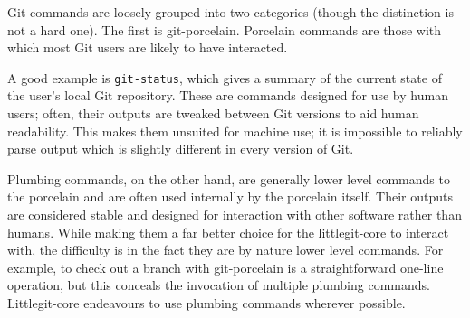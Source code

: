 Git commands are loosely grouped into two categories (though the distinction is not a hard one). The first is git-porcelain. Porcelain commands are those with which most Git users are likely to have interacted.

A good example is \texttt{git-status}, which gives a summary of the current state of the user's local Git repository. These are commands designed for use by human users; often, their outputs are tweaked between Git versions to aid human readability. This makes them unsuited for machine use; it is impossible to reliably parse output which is slightly different in every version of Git.

Plumbing commands, on the other hand, are generally lower level commands to the porcelain and are often used internally by the porcelain itself. Their outputs are considered stable and designed for interaction with other software rather than humans. While making them a far better choice for the littlegit-core to interact with, the difficulty is in the fact they are by nature lower level commands. For example, to check out a branch with git-porcelain is a straightforward one-line operation, but this conceals the invocation of multiple plumbing commands. Littlegit-core endeavours to use plumbing commands wherever possible.